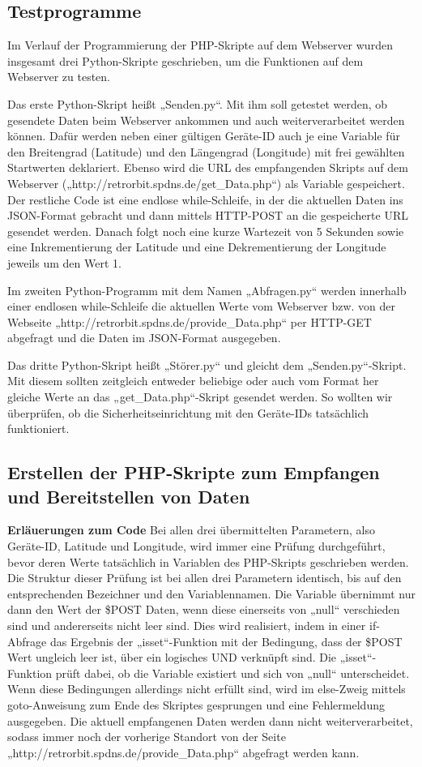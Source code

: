\subsection{Testprogramme}
Im Verlauf der Programmierung der PHP-Skripte auf dem Webserver wurden insgesamt drei Python-Skripte geschrieben, um die Funktionen auf dem Webserver zu testen.

Das erste Python-Skript heißt „Senden.py“. Mit ihm soll getestet werden, ob gesendete Daten beim Webserver ankommen und auch weiterverarbeitet werden können. Dafür werden neben einer gültigen Geräte-ID auch je eine Variable für den Breitengrad (Latitude) und den Längengrad (Longitude) mit frei gewählten Startwerten deklariert. Ebenso wird die URL des empfangenden Skripts auf dem Webserver („http://retrorbit.spdns.de/get\_Data.php“) als Variable gespeichert. Der restliche Code ist eine endlose while-Schleife, in der die aktuellen Daten ins JSON-Format gebracht und dann mittels HTTP-POST an die gespeicherte URL gesendet werden. Danach folgt noch eine kurze Wartezeit von 5 Sekunden sowie eine Inkrementierung der Latitude und eine Dekrementierung der Longitude jeweils um den Wert 1.

Im zweiten Python-Programm mit dem Namen „Abfragen.py“ werden innerhalb einer endlosen while-Schleife die aktuellen Werte vom Webserver bzw. von der Webseite „http://retrorbit.spdns.de/provide\_Data.php“ per HTTP-GET abgefragt und die Daten im JSON-Format ausgegeben.

Das dritte Python-Skript heißt „Störer.py“ und gleicht dem „Senden.py“-Skript. Mit diesem sollten zeitgleich entweder beliebige oder auch vom Format her gleiche Werte an das „get\_Data.php“-Skript gesendet werden. So wollten wir überprüfen, ob die Sicherheitseinrichtung mit den Geräte-IDs tatsächlich funktioniert.

\subsection{Erstellen der PHP-Skripte zum Empfangen und Bereitstellen von Daten}
\textbf{Erläuerungen zum Code }Bei allen drei übermittelten Parametern, also Geräte-ID, Latitude und Longitude, wird immer eine Prüfung durchgeführt, bevor deren Werte tatsächlich in Variablen des PHP-Skripts geschrieben werden. Die Struktur dieser Prüfung ist bei allen drei Parametern identisch, bis auf den entsprechenden Bezeichner und den Variablennamen.
Die Variable übernimmt nur dann den Wert der \$POST Daten, wenn diese einerseits von „null“ verschieden sind und andererseits nicht leer sind. Dies wird realisiert, indem in einer if-Abfrage das Ergebnis der „isset“-Funktion mit der Bedingung, dass der \$POST Wert ungleich leer ist, über ein logisches UND verknüpft sind. Die „isset“-Funktion prüft dabei, ob die Variable existiert und sich von „null“ unterscheidet. Wenn diese Bedingungen allerdings nicht erfüllt sind, wird im else-Zweig mittels goto-Anweisung zum Ende des Skriptes gesprungen und eine Fehlermeldung ausgegeben. Die aktuell empfangenen Daten werden dann nicht weiterverarbeitet, sodass immer noch der vorherige Standort von der Seite „http://retrorbit.spdns.de/provide\_Data.php“ abgefragt werden kann.


